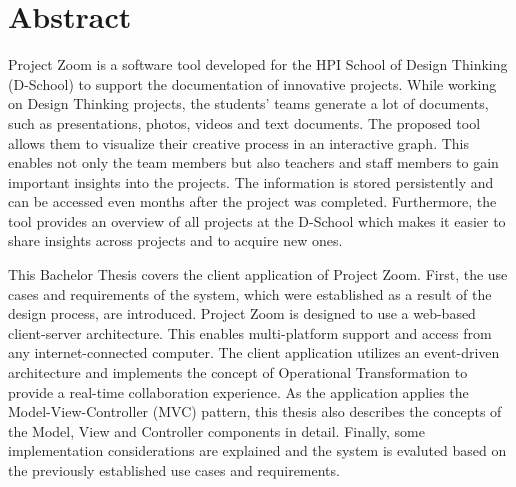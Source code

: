 \chapter*{Abstract}
\hypertarget{abstract}{}

Project Zoom is a software tool developed for the HPI School of Design Thinking (D-School) to support the documentation of innovative projects. While working on Design Thinking projects, the students' teams generate a lot of documents, such as presentations, photos, videos and text documents. The proposed tool allows them to visualize their creative process in an interactive graph. This enables not only the team members but also teachers and staff members to gain important insights into the projects. The information is stored persistently and can be accessed even months after the project was completed. Furthermore, the tool provides an overview of all projects at the D-School which makes it easier to share insights across projects and to acquire new ones.

This Bachelor Thesis covers the client application of Project Zoom. First, the use cases and requirements of the system, which were established as a result of the design process, are introduced. Project Zoom is designed to use a web-based client-server architecture. This enables multi-platform support and access from any internet-connected computer. The client application utilizes an event-driven architecture and implements the concept of Operational Transformation to provide a real-time collaboration experience. As the application applies the Model-View-Controller (MVC) pattern, this thesis also describes the concepts of the Model, View and Controller components in detail. Finally, some implementation considerations are explained and the system is evaluted based on the previously established use cases and requirements.